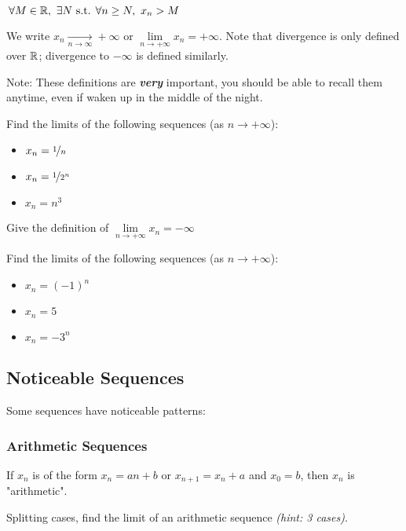 \begin{definition}
    $\,\forall M \in \mathbb{R}, \ \exists N \text{ s.t. } \forall n \geq N, \ x_n > M$
\end{definition}
We write $x_n \xrightarrow[n \to \infty]{} +\infty \text{ or } \lim\limits_{n \to +\infty} x_n = +\infty$.
Note that divergence is only defined over $\mathbb{R}$; divergence to $-\infty$ is defined similarly.

Note: These definitions are \textbf{\textit{very}} important, you should be able to recall them anytime, even if waken up in the middle of the night.

\begin{question}
    Find the limits of the following sequences (as $n \to +\infty$):
    \begin{itemize}
        \item $x_n = \nicefrac{1}{n}$
        \item $x_n = \nicefrac{1}{2^n}$
        \item $x_n = n^3$
    \end{itemize}
\end{question}
\begin{question}
    Give the definition of $\lim\limits_{n \to +\infty} x_n = -\infty$
\end{question}
\begin{question}
    Find the limits of the following sequences (as $n \to +\infty$):
    \begin{itemize}
        \item $x_n = (-1)^n$
        \item $x_n = 5$
        \item $x_n = -3^n$
    \end{itemize}
\end{question}



\subsection{Noticeable Sequences}
Some sequences have noticeable patterns:
\subsubsection{Arithmetic Sequences}
\begin{definition}
    If $x_n$ is of the form $x_n = an+b$ or $x_{n+1} = x_n+a$ and $x_0=b$, then $x_n$ is "arithmetic".
\end{definition}
\begin{question}
    Splitting cases, find the limit of an arithmetic sequence \textit{(hint: 3 cases)}.
\end{question}
